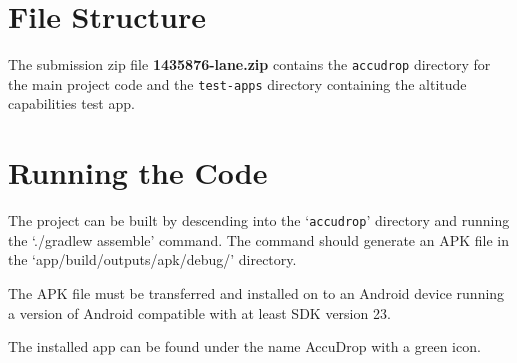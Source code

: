 \appendix
\section{File Structure}\label{sec:file-structure}
The submission zip file \textbf{1435876-lane.zip} contains the \texttt{accudrop} directory for the main project code and the \texttt{test-apps} directory containing the altitude capabilities test app.

\section{Running the Code}\label{sec:running-the-code}
The project can be built by descending into the `\texttt{accudrop}' directory and running the `./gradlew assemble' command. The command should generate an APK file in the `app/build/outputs/apk/debug/' directory.

\noindent The APK file must be transferred and installed on to an Android device running a version of Android compatible with at least SDK version 23.

\noindent The installed app can be found under the name AccuDrop with a green icon.
